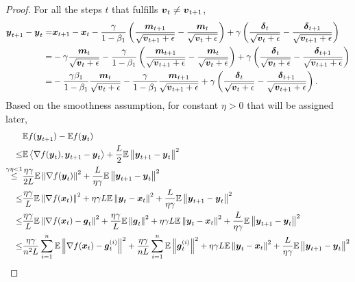 \begin{proof}
For all the steps $t$ that fulfills $\boldsymbol{v}_{t} \neq \boldsymbol{v}_{t+1}$,
\begin{align*}
    \boldsymbol{y}_{t+1} - \boldsymbol{y}_t = & \boldsymbol{x}_{t+1} - \boldsymbol{x}_t - \frac{\gamma}{1- \beta_1} \left(\frac{\boldsymbol{m}_{t+1}}{\sqrt{\boldsymbol{v}_{t+1}+\epsilon}} - \frac{\boldsymbol{m}_{t}}{\sqrt{\boldsymbol{v}_{t}+\epsilon}} \right) + \gamma\left( \frac{\boldsymbol{\delta}_{t}}{\sqrt{\boldsymbol{v}_{t}+\epsilon}} - \frac{\boldsymbol{\delta}_{t+1}}{\sqrt{\boldsymbol{v}_{t+1}+\epsilon}}\right) \\
= & -\gamma\frac{\boldsymbol{m}_t}{\sqrt{\boldsymbol{v}_t + \epsilon}}  - \frac{\gamma}{1- \beta_1} \left(\frac{\boldsymbol{m}_{t+1}}{\sqrt{\boldsymbol{v}_{t+1}+\epsilon}} - \frac{\boldsymbol{m}_{t}}{\sqrt{\boldsymbol{v}_{t}+\epsilon}} \right) + \gamma\left( \frac{\boldsymbol{\delta}_{t}}{\sqrt{\boldsymbol{v}_{t}+\epsilon}} - \frac{\boldsymbol{\delta}_{t+1}}{\sqrt{\boldsymbol{v}_{t+1}+\epsilon}}\right) \\
    = & -\frac{\gamma\beta_1}{1-\beta_1}\frac{\boldsymbol{m}_t}{\sqrt{\boldsymbol{v}_t + \epsilon}}  - \frac{\gamma}{1- \beta_1} \frac{\boldsymbol{m}_{t+1}}{\sqrt{\boldsymbol{v}_{t+1}+\epsilon}} + \gamma\left( \frac{\boldsymbol{\delta}_{t}}{\sqrt{\boldsymbol{v}_{t}+\epsilon}} - \frac{\boldsymbol{\delta}_{t+1}}{\sqrt{\boldsymbol{v}_{t+1}+\epsilon}}\right).
\end{align*}
Based on the smoothness assumption, for constant $\eta>0$ that will be assigned later,
\begin{align*}
    & \mathbb E f(\*{y}_{t+1}) - \mathbb Ef(\*{y}_{t}) \\
    \leq & \mathbb E\left\langle \nabla f(\*{y}_t), \*{y}_{t+1} - \*{y}_t \right\rangle + \frac{L}{2}\mathbb E\left\|\*{y}_{t+1} - \*{y}_t \right\|^2 \\
        \overset{\gamma\eta<1}{\leq} & \frac{\eta\gamma}{2L}\mathbb E\left\|\nabla f(\*y_t)\right\|^2 + \frac{L}{\eta\gamma}\mathbb E\left\|\*{y}_{t+1} - \*{y}_t \right\|^2 \\
    \leq & \frac{\eta\gamma}{L}\mathbb E\left\|\nabla f(\*x_t)\right\|^2 + \eta\gamma L\mathbb E\left\| \*y_t - \*x_t\right\|^2 + \frac{L}{\eta\gamma}\mathbb E\left\|\*{y}_{t+1} - \*{y}_t \right\|^2 \\
        \leq & \frac{\eta\gamma}{L}\mathbb E\left\|\nabla f(\*x_t) - \*g_t\right\|^2 + \frac{\eta\gamma}{L}\mathbb E\left\|\*g_t\right\|^2 + \eta\gamma L\mathbb E\left\| \*y_t - \*x_t\right\|^2 + \frac{L}{\eta\gamma}\mathbb E\left\|\*{y}_{t+1} - \*{y}_t \right\|^2 \\
    \leq & \frac{\eta\gamma}{n^2L}\sum_{i=1}^{n}\mathbb E\left\|\nabla f(\*x_t) - \*g_t^{(i)}\right\|^2 + \frac{\eta\gamma}{nL}\sum_{i=1}^{n}\mathbb E\left\|\*g_t^{(i)}\right\|^2 + \eta\gamma L\mathbb E\left\| \*y_t - \*x_t\right\|^2 + \frac{L}{\eta\gamma}\mathbb E\left\|\*{y}_{t+1} - \*{y}_t \right\|^2 \\

\end{align*}
\end{proof}

